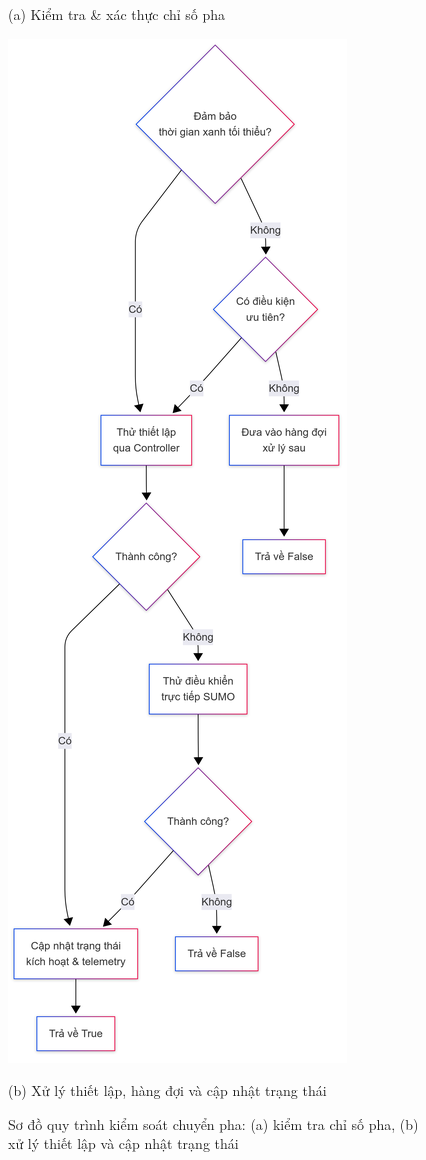 \documentclass[12pt,a4paper,oneside]{report}
\begin{document}
\begin{figure}[htbp]
\begin{minipage}[t]{0.48\textwidth}
        \caption*{(a) Kiểm tra & xác thực chỉ số pha}
    \end{minipage}
    \hfill
    \begin{minipage}[t]{0.48\textwidth}
        \centering
        \includegraphics[width=0.9\linewidth]{Untitled diagram _ Mermaid Chart-2025-08-22-064805.png}
        \caption*{(b) Xử lý thiết lập, hàng đợi và cập nhật trạng thái}
    \end{minipage}
    \caption{Sơ đồ quy trình kiểm soát chuyển pha: (a) kiểm tra chỉ số pha, (b) xử lý thiết lập và cập nhật trạng thái}
    \label{fig:phase_control_pair}
\end{figure}
\end{document}
